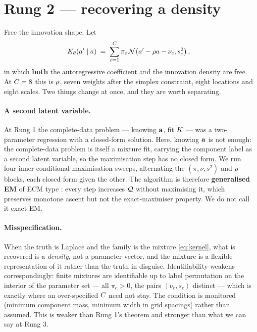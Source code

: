 \documentclass{article}
\begin{document}
\section{Rung 2 --- recovering a density}
\label{sec:rung2}

Free the innovation shape. Let
\begin{equation}
\label{eq:kernel}
K_{\theta}(a'\mid a) \;=\; \sum_{c=1}^{C} \pi_c \,
\mathcal{N}\!\left(a' - \rho a - \nu_c,s_c^2\right),
\end{equation}
in which \textbf{both} the autoregressive coefficient and the innovation density are free. At
$C=8$ this is $\rho$, seven weights after the simplex constraint, eight locations and eight
scales. Two things change at once, and they are worth separating.

\paragraph{A second latent variable.} At Rung 1 the complete-data problem --- knowing $\mathbf{a}$, fit
$K$ --- was a two-parameter regression with a closed-form solution. Here, knowing $\mathbf{a}$ is
not enough: the complete-data problem is itself a mixture fit, carrying the component label as a
second latent variable, so the maximisation step has no closed form. We run four inner
conditional-maximisation sweeps, alternating the $(\pi,\nu,s^2)$ and $\rho$ blocks, each closed
form given the other. The algorithm is therefore \textbf{generalised EM} of ECM type
\citep{dempster1977,meng1993}: every step increases $\mathcal{Q}$ without maximising it, which preserves
monotone ascent \citep{wu1983} but not the exact-maximiser property. We do not call it exact EM.

\paragraph{Misspecification.} When the truth is Laplace and the family is the mixture
\eqref{eq:kernel}, what is recovered is a \emph{density}, not a parameter vector, and the mixture
is a flexible representation of it rather than the truth in disguise. Identifiability weakens
correspondingly: finite mixtures are identifiable up to label permutation on the interior of the
parameter set --- all $\pi_c>0$, the pairs $(\nu_c,s_c)$ distinct \citep{teicher1963,yakowitz1968}
--- which is exactly where an over-specified $C$ need not stay. The condition is monitored
(minimum component mass, minimum width in grid spacings) rather than assumed. This is weaker than
Rung 1's theorem and stronger than what we can say at Rung 3.
\end{document}
